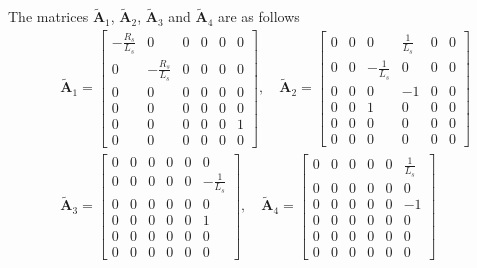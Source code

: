 \documentclass[12pt,a4paper,oneside]{book}
\begin{document}
\begin{onehalfspace}
The matrices $\tilde{\mathbf{A}}_1$, $\tilde{\mathbf{A}}_2$, 
$\tilde{\mathbf{A}}_3$ and $\tilde{\mathbf{A}}_4$ are as follows
\begin{equation}\label{pmsm_problem_1_eq_11}
	\begin{aligned}
		&\tilde{\mathbf{A}}_1 = 
		\begin{bmatrix} 
			-\frac{R_s}{L_s} & 0 & 0 & 0 & 0 & 0 \\[6pt]			
			0 & -\frac{R_s}{L_s} & 0 & 0 & 0 & 0 \\[6pt]
			0 & 0 & 0 & 0 & 0 & 0 \\[6pt]
			0 & 0 & 0 & 0 & 0 & 0 \\[6pt]
			0 & 0 & 0 & 0 & 0 & 1 \\[6pt]
			0 & 0 & 0 & 0 & 0 & 0
		\end{bmatrix},\quad
		\tilde{\mathbf{A}}_2 = 
		\begin{bmatrix} 
			0 & 0 & 0 & \frac{1}{L_s} & 0 & 0 \\[6pt]			
			0 & 0 & -\frac{1}{L_s} & 0 & 0 & 0 \\[6pt]
			0 & 0 & 0 & -1 & 0 & 0 \\[6pt]
			0 & 0 & 1 & 0 & 0 & 0 \\[6pt]
			0 & 0 & 0 & 0 & 0 & 0 \\[6pt]
			0 & 0 & 0 & 0 & 0 & 0
		\end{bmatrix} \\[8pt]
		&\tilde{\mathbf{A}}_3 = 
		\begin{bmatrix} 
			0 & 0 & 0 & 0 & 0 & 0 \\[6pt]			
			0 & 0 & 0 & 0 & 0 & -\frac{1}{L_s} \\[6pt]
			0 & 0 & 0 & 0 & 0 & 0 \\[6pt]
			0 & 0 & 0 & 0 & 0 & 1 \\[6pt]
			0 & 0 & 0 & 0 & 0 & 0 \\[6pt]
			0 & 0 & 0 & 0 & 0 & 0
		\end{bmatrix},\quad
		\tilde{\mathbf{A}}_4 = 
		\begin{bmatrix} 
			0 & 0 & 0 & 0 & 0 & \frac{1}{L_s} \\[6pt]			
			0 & 0 & 0 & 0 & 0 & 0 \\[6pt]
			0 & 0 & 0 & 0 & 0 & -1 \\[6pt]
			0 & 0 & 0 & 0 & 0 & 0 \\[6pt]
			0 & 0 & 0 & 0 & 0 & 0 \\[6pt]
			0 & 0 & 0 & 0 & 0 & 0
		\end{bmatrix} 
	\end{aligned}
\end{equation} 


\end{onehalfspace}
\end{document}
